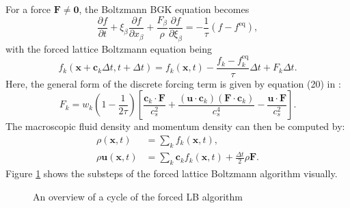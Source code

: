 \documentclass[a4paper, 11pt]{report}
\begin{document}

For a force $\mathbf{F} \neq \mathbf{0}$, the Boltzmann BGK equation becomes
\begin{equation}
    \frac{\partial f}{\partial t} + \xi_\beta\frac{\partial f}{\partial x_\beta} + \frac{F_\beta}{\rho} \frac{\partial f}{\partial \xi_\beta} = -\frac{1}{\tau}(f - f^{\mathrm{eq}}), \label{eq:3.56}
\end{equation}
with the forced lattice Boltzmann equation being
\begin{equation}
    f_k(\mathbf{x} + \mathbf{c}_k\Delta t, t + \Delta t) = f_k(\mathbf{x}, t) -\frac{f_k - f_k^{\mathrm{eq}}}{\tau}\Delta t + F_k\Delta t. \label{eq:3.57}
\end{equation}
Here, the general form of the discrete forcing term is given by equation (20) in \cite{guoetal}:
\begin{equation}
    F_k = w_k\left(1-\frac{1}{2\tau}\right)\left[\frac{\mathbf{c}_k\cdot\mathbf{F}}{c_s^2} + \frac{(\mathbf{u}\cdot\mathbf{c}_k)(\mathbf{F}\cdot\mathbf{c}_k)}{c_s^4} - \frac{\mathbf{u}\cdot\mathbf{F}}{c_s^2}\right]. \label{eq:3.58}
\end{equation}
The macroscopic fluid density and momentum density can then be computed by:
\begin{subequations} \label{eq:3.59}
\begin{align}
    \rho(\mathbf{x},t) &= \sum_k f_k(\mathbf{x},t), \label{eq:3.59a} \\
    \rho\mathbf{u}(\mathbf{x},t) &= \sum_k \mathbf{c}_k f_k(\mathbf{x},t) + \frac{\Delta t}{2}\rho\mathbf{F}. \label{eq:3.59b}
\end{align}
\end{subequations}
Figure \ref{fig:forcedalgo} shows the substeps of the forced lattice Boltzmann algorithm visually.

\begin{figure}[!htb]
\centering

\caption{An overview of a cycle of the forced LB algorithm} \label{fig:forcedalgo}
\end{figure}
\end{document}
